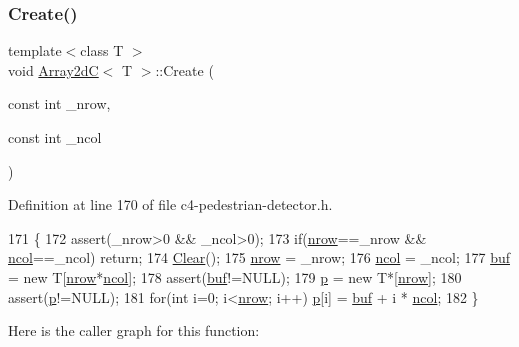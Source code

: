 \subsubsection{\texorpdfstring{Create()}{Create()}}
{\footnotesize\ttfamily template$<$class T $>$ \\
void \mbox{\hyperlink{class_array2d_c}{Array2dC}}$<$ T $>$\+::Create (\begin{DoxyParamCaption}\item[{const int}]{\+\_\+nrow,  }\item[{const int}]{\+\_\+ncol }\end{DoxyParamCaption})}



Definition at line 170 of file c4-\/pedestrian-\/detector.\+h.


\begin{DoxyCode}
171 \{
172     assert(\_nrow>0 && \_ncol>0);
173     \textcolor{keywordflow}{if}(\mbox{\hyperlink{class_array2d_c_a12f690f7195f7674a86a7e1eedbc473c}{nrow}}==\_nrow && \mbox{\hyperlink{class_array2d_c_a27e0f8f40f644831cd7c750db59dc28a}{ncol}}==\_ncol) \textcolor{keywordflow}{return};
174     \mbox{\hyperlink{class_array2d_c_a76a406cfeb9a9f75a1586e0a7b22f63e}{Clear}}();
175     \mbox{\hyperlink{class_array2d_c_a12f690f7195f7674a86a7e1eedbc473c}{nrow}} = \_nrow;
176     \mbox{\hyperlink{class_array2d_c_a27e0f8f40f644831cd7c750db59dc28a}{ncol}} = \_ncol;
177     \mbox{\hyperlink{class_array2d_c_a25d8fa5049d4c7ded126e0acdd18f37a}{buf}} = \textcolor{keyword}{new} T[\mbox{\hyperlink{class_array2d_c_a12f690f7195f7674a86a7e1eedbc473c}{nrow}}*\mbox{\hyperlink{class_array2d_c_a27e0f8f40f644831cd7c750db59dc28a}{ncol}}];
178     assert(\mbox{\hyperlink{class_array2d_c_a25d8fa5049d4c7ded126e0acdd18f37a}{buf}}!=NULL);
179     \mbox{\hyperlink{class_array2d_c_a727eae5d663d463635cc150e6f771f0d}{p}} = \textcolor{keyword}{new} T*[\mbox{\hyperlink{class_array2d_c_a12f690f7195f7674a86a7e1eedbc473c}{nrow}}];
180     assert(\mbox{\hyperlink{class_array2d_c_a727eae5d663d463635cc150e6f771f0d}{p}}!=NULL);
181     \textcolor{keywordflow}{for}(\textcolor{keywordtype}{int} i=0; i<\mbox{\hyperlink{class_array2d_c_a12f690f7195f7674a86a7e1eedbc473c}{nrow}}; i++) \mbox{\hyperlink{class_array2d_c_a727eae5d663d463635cc150e6f771f0d}{p}}[i] = \mbox{\hyperlink{class_array2d_c_a25d8fa5049d4c7ded126e0acdd18f37a}{buf}} + i * \mbox{\hyperlink{class_array2d_c_a27e0f8f40f644831cd7c750db59dc28a}{ncol}};
182 \}
\end{DoxyCode}
Here is the caller graph for this function\+:
\nopagebreak
